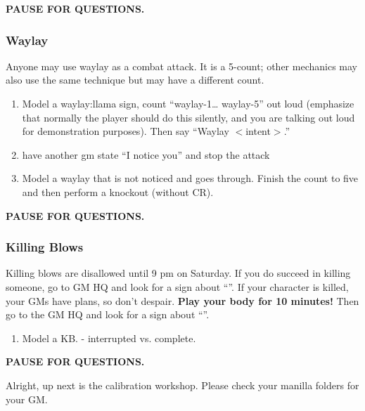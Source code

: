 \documentclass[green]{GL2020}
\begin{document}
\textbf{PAUSE FOR QUESTIONS.}

\subsubsection*{Waylay}
Anyone may use waylay as a combat attack. It is a 5-count; other mechanics may also use the same technique but may have a different count.
\begin{enumerate}
	\item Model a waylay:llama sign, count ``waylay-1\ldots{} waylay-5'' out loud (emphasize that normally the player should do this silently, and you are talking out loud for demonstration purposes). Then say ``Waylay $<$intent$>$.''
	\item have another gm state “I notice you” and stop the attack
	\item Model a waylay that is not noticed and goes through.  Finish the count to five and then perform a knockout (without CR).

\end{enumerate}

\textbf{PAUSE FOR QUESTIONS.}

\subsubsection*{Killing Blows}
Killing blows are disallowed until 9 pm on Saturday. If you do succeed in killing someone, go to GM HQ and look for a sign about ``\sMurderConsequences{}''. If your character is killed, your GMs have plans, so don’t despair. \textbf{Play your body for 10 minutes!} Then go to the GM HQ and look for a sign about ``\sMurdered{}''.

\begin{enumerate}
	\item Model a KB. - interrupted vs. complete.
\end{enumerate}

\textbf{PAUSE FOR QUESTIONS.}

Alright, up next is the calibration workshop. Please check your manilla folders for your GM.
\end{document}
